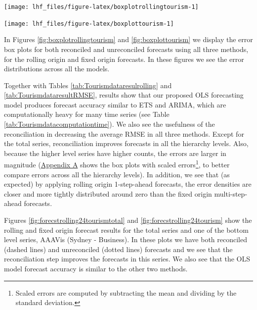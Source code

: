 \documentclass[11pt,a4paper,]{article}
\let\origfigure\figure
\let\endorigfigure\endfigure
\renewenvironment{figure}[1][2] {
    \expandafter\origfigure\expandafter[!htbp]
} {
    \endorigfigure
}
\begin{document}
\begin{figure}

{\centering \texttt{[image: lhf\_files/figure-latex/boxplotrollingtourism-1]} 

}

\caption{Box plots of rolling origin forecast errors from reconciled and unreconciled ETS, ARIMA and OLS methods at each hierarchical level.}\label{fig:boxplotrollingtourism}
\end{figure}

\begin{figure}

{\centering \texttt{[image: lhf\_files/figure-latex/boxplottourism-1]} 

}

\caption{Box plots of fixed origin forecast errors for reconciled and unreconciled ETS, ARIMA and OLS methods at each hierarchical level.}\label{fig:boxplottourism}
\end{figure}

In Figures \ref{fig:boxplotrollingtourism} and \ref{fig:boxplottourism} we display the error box plots for both reconciled and unreconciled forecasts using all three methods, for the rolling origin and fixed origin forecasts. In these figures we see the error distributions across all the models.

Together with Tables \ref{tab:Tourismdataresulrolling} and \ref{tab:TourismdataresultRMSE}, results show that our proposed OLS forecasting model produces forecast accuracy similar to ETS and ARIMA, which are computationally heavy for many time series (see Table \ref{tab:Tourismdatacomputationtime}). We also see the usefulness of the reconciliation in decreasing the average RMSE in all three methods. Except for the total series, reconciliation improves forecasts in all the hierarchy levels. Also, because the higher level series have higher counts, the errors are larger in magnitude (\protect\hyperlink{appendixA}{Appendix A} shows the box plots with scaled errors\footnote{Scaled errors are computed by subtracting the mean and dividing by the standard deviation.}, to better compare errors across all the hierarchy levels). In addition, we see that (as expected) by applying rolling origin 1-step-ahead forecasts, the error densities are closer and more tightly distributed around zero than the fixed origin multi-step-ahead forecasts.

Figures \ref{fig:forecstrolling24tourismtotal} and \ref{fig:forecstrolling24tourism} show the rolling and fixed origin forecast results for the total series and one of the bottom level series, AAAVis (Sydney - Business). In these plots we have both reconciled (dashed lines) and unreconciled (dotted lines) forecasts and we see that the reconciliation step improves the forecasts in this series. We also see that the OLS model forecast accuracy is similar to the other two methods.
\end{document}
